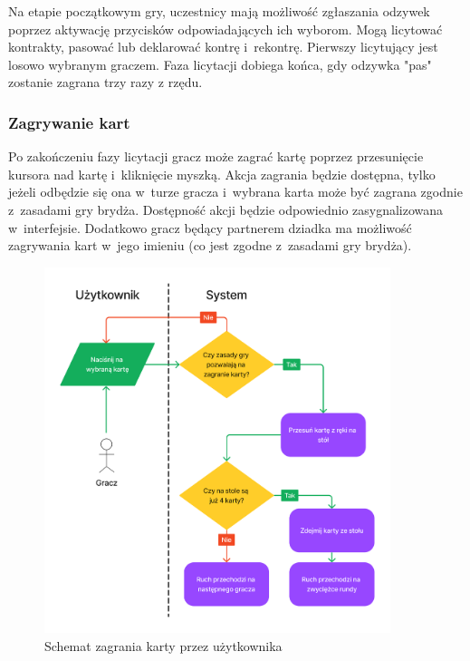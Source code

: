Na etapie początkowym gry, uczestnicy mają możliwość zgłaszania odzywek poprzez
aktywację przycisków odpowiadających ich wyborom. Mogą licytować kontrakty, pasować lub
deklarować kontrę i~rekontrę. Pierwszy licytujący jest losowo
wybranym graczem. Faza licytacji dobiega końca, gdy odzywka "pas"\xspace zostanie zagrana
trzy razy z rzędu.


\FloatBarrier


\subsubsection{Zagrywanie kart}

Po zakończeniu fazy licytacji gracz może zagrać kartę poprzez
przesunięcie kursora nad kartę i~kliknięcie myszką. Akcja zagrania
będzie dostępna, tylko jeżeli odbędzie się ona w~turze gracza
i~wybrana karta może być zagrana zgodnie z~zasadami gry brydża.
Dostępność akcji będzie odpowiednio zasygnalizowana w~interfejsie.
Dodatkowo gracz będący partnerem dziadka
ma możliwość zagrywania kart w~jego imieniu (co
jest zgodne z~zasadami gry brydża).

\begin{figure}[hbt!]
    \centering
    \includegraphics[width=0.9\textwidth]{img/schematy/play_card.png}
    \caption{Schemat zagrania karty przez użytkownika}
\end{figure}

